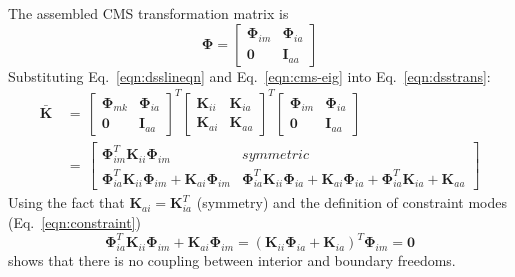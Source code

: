 \documentclass[10pt,openany,twoside]{book}
\numberwithin{equation}{section}   %
\newcommand{\Matrix}[1]{\boldsymbol{#1}}
\newcommand{\Eqn}[1]{Eq.\ \ref{#1}}
\begin{document}
The assembled CMS transformation matrix is
\begin{equation}
\Matrix{\Phi} = \left[
\begin{array}{cc}
   \Matrix{\Phi}_{im} & \Matrix{\Phi}_{ia} \\
   \Matrix{0} & \Matrix{I}_{aa}
\end{array}
\right]			\nonumber
\end{equation}
Substituting \Eqn{eqn:dsslineqn} and \Eqn{eqn:cms-eig} into \Eqn{eqn:dsstrans}:
\begin{equation}
\begin{split}
\Matrix{\bar{K}} & \, = \, \left[
        \begin{array}{cc}
                \Matrix{\Phi}_{mk} & \Matrix{\Phi}_{ia} \\
                \Matrix{0} & \Matrix{I}_{aa}
        \end{array}
        \right]^T \left[
        \begin{array}{cc}
                \Matrix{K}_{ii} & \Matrix{K}_{ia} \\
                \Matrix{K}_{ai} & \Matrix{K}_{aa}
        \end{array}
        \right]^T \left[
        \begin{array}{cc}
                \Matrix{\Phi}_{im} & \Matrix{\Phi}_{ia} \\
                \Matrix{0} & \Matrix{I}_{aa}
        \end{array}
        \right]                                 \\
 & \, = \, \left[
\begin{array}{cc}
   \Matrix{\Phi}_{im}^T \Matrix{K}_{ii} \Matrix{\Phi}_{im} & symmetric \\
   \Matrix{\Phi}_{ia}^T \Matrix{K}_{ii} \Matrix{\Phi}_{im} + \Matrix{K}_{ai} \Matrix{\Phi}_{im} &
                        \Matrix{\Phi}_{ia}^T \Matrix{K}_{ii} \Matrix{\Phi}_{ia} +
                        \Matrix{K}_{ai} \Matrix{\Phi}_{ia} + \Matrix{\Phi}_{ia}^T \Matrix{K}_{ia} + \Matrix{K}_{aa}
\end{array}
\right]
\end{split}		\nonumber
\end{equation}
Using the fact that $\Matrix{K}_{ai} = \Matrix{K}_{ia}^T$ (symmetry)
and the definition of constraint modes (\Eqn{eqn:constraint})
\begin{equation}
\Matrix{\Phi}_{ia}^T \Matrix{K}_{ii} \Matrix{\Phi}_{im} + \Matrix{K}_{ai} \Matrix{\Phi}_{im} =
                \left( \Matrix{K}_{ii} \Matrix{\Phi}_{ia} + \Matrix{K}_{ia} \right)^T \Matrix{\Phi}_{im} = \Matrix{0}		\nonumber
\end{equation}
shows that there is no coupling between interior and boundary freedoms.
\end{document}
